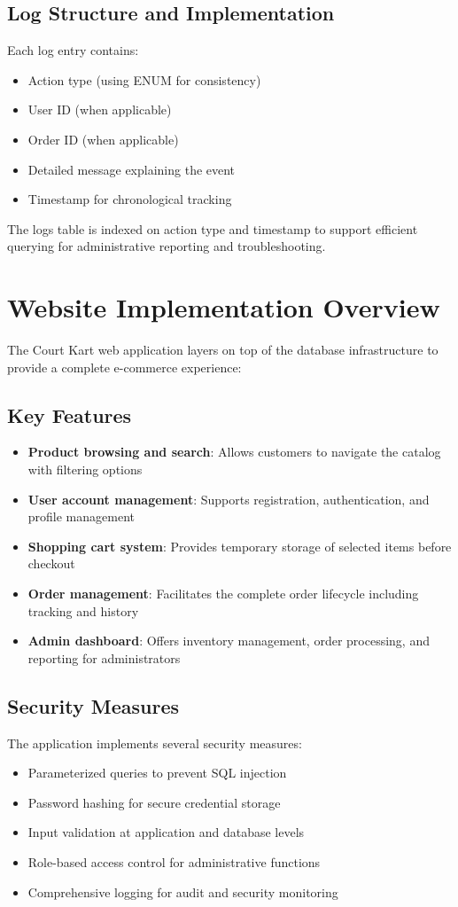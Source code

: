 \documentclass[13pt,a4paper]{article}
\begin{document}
\subsection{Log Structure and Implementation}
Each log entry contains:
\begin{itemize}
	\item Action type (using ENUM for consistency)
	\item User ID (when applicable)
	\item Order ID (when applicable)
	\item Detailed message explaining the event
	\item Timestamp for chronological tracking
\end{itemize}

The logs table is indexed on action type and timestamp to support efficient querying for administrative reporting and troubleshooting.

\section{Website Implementation Overview}

The Court Kart web application layers on top of the database infrastructure to provide a complete e-commerce experience:

\subsection{Key Features}
\begin{itemize}
	\item \textbf{Product browsing and search}: Allows customers to navigate the catalog with filtering options
	\item \textbf{User account management}: Supports registration, authentication, and profile management
	\item \textbf{Shopping cart system}: Provides temporary storage of selected items before checkout
	\item \textbf{Order management}: Facilitates the complete order lifecycle including tracking and history
	\item \textbf{Admin dashboard}: Offers inventory management, order processing, and reporting for administrators
\end{itemize}

\subsection{Security Measures}
The application implements several security measures:
\begin{itemize}
	\item Parameterized queries to prevent SQL injection
	\item Password hashing for secure credential storage
	\item Input validation at application and database levels
	\item Role-based access control for administrative functions
	\item Comprehensive logging for audit and security monitoring
\end{itemize}
\end{document}
